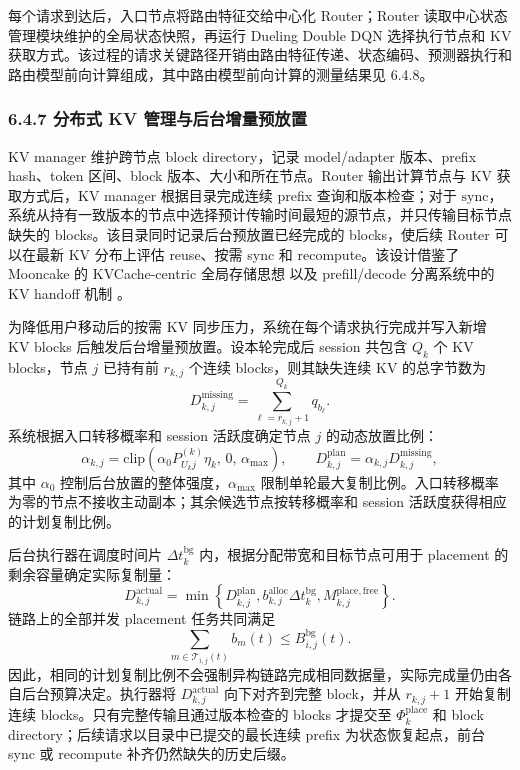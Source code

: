 每个请求到达后，入口节点将路由特征交给中心化 Router；Router 读取中心状态管理模块维护的全局状态快照，再运行 Dueling Double DQN 选择执行节点和 KV 获取方式。该过程的请求关键路径开销由路由特征传递、状态编码、预测器执行和路由模型前向计算组成，其中路由模型前向计算的测量结果见 6.4.8。

\subsubsection*{6.4.7 分布式 KV 管理与后台增量预放置}

KV manager 维护跨节点 block directory，记录 model/adapter 版本、prefix hash、token 区间、block 版本、大小和所在节点。Router 输出计算节点与 KV 获取方式后，KV manager 根据目录完成连续 prefix 查询和版本检查；对于 \(\mathrm{sync}\)，系统从持有一致版本的节点中选择预计传输时间最短的源节点，并只传输目标节点缺失的 blocks。该目录同时记录后台预放置已经完成的 blocks，使后续 Router 可以在最新 KV 分布上评估 reuse、按需 sync 和 recompute。该设计借鉴了 Mooncake 的 KVCache-centric 全局存储思想 \cite{qin2025mooncake} 以及 prefill/decode 分离系统中的 KV handoff 机制 \cite{zhong2024distserve}。

为降低用户移动后的按需 KV 同步压力，系统在每个请求执行完成并写入新增 KV blocks 后触发后台增量预放置。设本轮完成后 session 共包含 \(Q_k\) 个 KV blocks，节点 \(j\) 已持有前 \(r_{k,j}\) 个连续 blocks，则其缺失连续 KV 的总字节数为
\[
D_{k,j}^{\mathrm{missing}}
=
\sum_{\ell=r_{k,j}+1}^{Q_k}q_{b_\ell}.
\]
系统根据入口转移概率和 session 活跃度确定节点 \(j\) 的动态放置比例：
\[
\alpha_{k,j}
=
\mathrm{clip}
\left(
\alpha_0 P_{U_kj}^{(k)}\eta_k,\,
0,\,
\alpha_{\max}
\right),
\qquad
D_{k,j}^{\mathrm{plan}}
=
\alpha_{k,j}D_{k,j}^{\mathrm{missing}},
\]
其中 \(\alpha_0\) 控制后台放置的整体强度，\(\alpha_{\max}\) 限制单轮最大复制比例。入口转移概率为零的节点不接收主动副本；其余候选节点按转移概率和 session 活跃度获得相应的计划复制比例。

后台执行器在调度时间片 \(\Delta t_k^{\mathrm{bg}}\) 内，根据分配带宽和目标节点可用于 placement 的剩余容量确定实际复制量：
\[
D_{k,j}^{\mathrm{actual}}
=
\min
\left\{
D_{k,j}^{\mathrm{plan}},
b_{k,j}^{\mathrm{alloc}}\Delta t_k^{\mathrm{bg}},
M_{k,j}^{\mathrm{place,free}}
\right\}.
\]
链路上的全部并发 placement 任务共同满足
\[
\sum_{m\in\mathcal T_{i,j}(t)}b_m(t)
\leq
B_{i,j}^{\mathrm{bg}}(t).
\]
因此，相同的计划复制比例不会强制异构链路完成相同数据量，实际完成量仍由各自后台预算决定。执行器将 \(D_{k,j}^{\mathrm{actual}}\) 向下对齐到完整 block，并从 \(r_{k,j}+1\) 开始复制连续 blocks。只有完整传输且通过版本检查的 blocks 才提交至 \(\Phi_k^{\mathrm{place}}\) 和 block directory；后续请求以目录中已提交的最长连续 prefix 为状态恢复起点，前台 sync 或 recompute 补齐仍然缺失的历史后缀。

